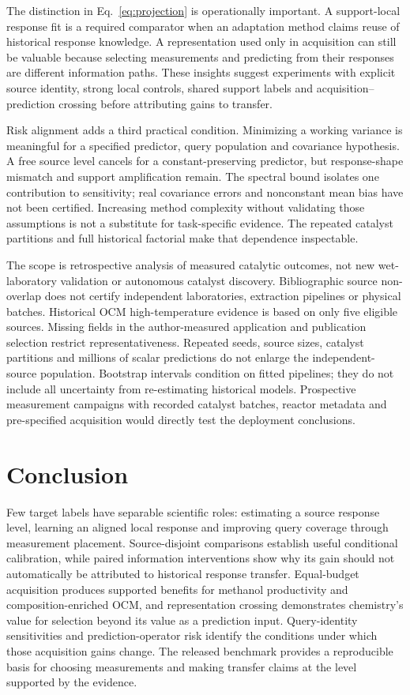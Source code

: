\documentclass[11pt]{article}
\begin{document}
The distinction in Eq.~\ref{eq:projection} is operationally important. A support-local response fit is a required comparator when an adaptation method claims reuse of historical response knowledge. A representation used only in acquisition can still be valuable because selecting measurements and predicting from their responses are different information paths. These insights suggest experiments with explicit source identity, strong local controls, shared support labels and acquisition--prediction crossing before attributing gains to transfer.

Risk alignment adds a third practical condition. Minimizing a working variance is meaningful for a specified predictor, query population and covariance hypothesis. A free source level cancels for a constant-preserving predictor, but response-shape mismatch and support amplification remain. The spectral bound isolates one contribution to sensitivity; real covariance errors and nonconstant mean bias have not been certified. Increasing method complexity without validating those assumptions is not a substitute for task-specific evidence. The repeated catalyst partitions and full historical factorial make that dependence inspectable.

The scope is retrospective analysis of measured catalytic outcomes, not new wet-laboratory validation or autonomous catalyst discovery. Bibliographic source non-overlap does not certify independent laboratories, extraction pipelines or physical batches. Historical OCM high-temperature evidence is based on only five eligible sources. Missing fields in the author-measured application and publication selection restrict representativeness. Repeated seeds, source sizes, catalyst partitions and millions of scalar predictions do not enlarge the independent-source population. Bootstrap intervals condition on fitted pipelines; they do not include all uncertainty from re-estimating historical models. Prospective measurement campaigns with recorded catalyst batches, reactor metadata and pre-specified acquisition would directly test the deployment conclusions.

\section{Conclusion}
Few target labels have separable scientific roles: estimating a source response level, learning an aligned local response and improving query coverage through measurement placement. Source-disjoint comparisons establish useful conditional calibration, while paired information interventions show why its gain should not automatically be attributed to historical response transfer. Equal-budget acquisition produces supported benefits for methanol productivity and composition-enriched OCM, and representation crossing demonstrates chemistry's value for selection beyond its value as a prediction input. Query-identity sensitivities and prediction-operator risk identify the conditions under which those acquisition gains change. The released benchmark provides a reproducible basis for choosing measurements and making transfer claims at the level supported by the evidence.
\end{document}
